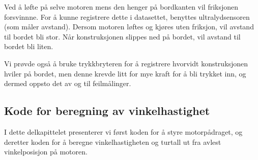 Ved å løfte på selve motoren mens den henger på bordkanten vil
friksjonen
forsvinnne. For å kunne registrere dette i datasettet,
benyttes 
ultralydsensoren (som måler avstand).
Dersom motoren løftes og
kjøres uten friksjon, vil avstand til bordet bli stor. Når
konstruksjonen slippes ned på bordet, vil avstand til bordet bli
liten. 


Vi prøvde også å bruke trykkbryteren for å
\reversemarginpar{}
registrere hvorvidt konstruksjonen hviler på bordet, men denne
krevde litt for mye kraft for å bli trykket inn, og dermed oppsto det
av og til feilmålinger.


\subsection{Kode for beregning av vinkelhastighet}
I dette delkapittelet presenterer vi først koden for å styre
motorpådraget, og deretter koden for å beregne
vinkelhastigheten og turtall ut fra avlest vinkelposisjon på motoren.

